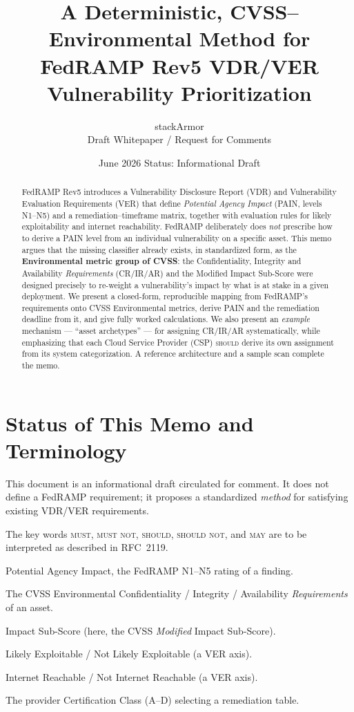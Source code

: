 \documentclass[11pt]{article}
\title{\bfseries A Deterministic, CVSS--Environmental Method for\\
FedRAMP Rev5 VDR/VER Vulnerability Prioritization}
\author{stackArmor \\ \small Draft Whitepaper / Request for Comments}
\date{June 2026 \quad\textbar\quad Status: Informational Draft}
\newcommand{\rfckw}[1]{\textsc{#1}}
\begin{document}
\maketitle

\begin{abstract}
\noindent
FedRAMP Rev5 introduces a Vulnerability Disclosure Report (VDR) and Vulnerability
Evaluation Requirements (VER) that define \emph{Potential Agency Impact} (PAIN,
levels N1--N5) and a remediation--timeframe matrix, together with evaluation rules
for likely exploitability and internet reachability. FedRAMP deliberately does
\emph{not} prescribe how to derive a PAIN level from an individual vulnerability on
a specific asset. This memo argues that the missing classifier already exists, in
standardized form, as the \textbf{Environmental metric group of CVSS}: the
Confidentiality, Integrity and Availability \emph{Requirements} (CR/IR/AR) and the
Modified Impact Sub-Score were designed precisely to re-weight a vulnerability's
impact by what is at stake in a given deployment. We present a closed-form,
reproducible mapping from FedRAMP's requirements onto CVSS Environmental metrics,
derive PAIN and the remediation deadline from it, and give fully worked
calculations. We also present an \emph{example} mechanism --- ``asset archetypes''
--- for assigning CR/IR/AR systematically, while emphasizing that each Cloud Service
Provider (CSP) \rfckw{should} derive its own assignment from its system
categorization. A reference architecture and a sample scan complete the memo.
\end{abstract}

\tableofcontents

\section{Status of This Memo and Terminology}
This document is an informational draft circulated for comment. It does not define
a FedRAMP requirement; it proposes a standardized \emph{method} for satisfying
existing VDR/VER requirements.

The key words \rfckw{must}, \rfckw{must not}, \rfckw{should}, \rfckw{should not},
and \rfckw{may} are to be interpreted as described in RFC~2119.

\begin{description}[leftmargin=1.5em,style=nextline]
\item[PAIN] Potential Agency Impact, the FedRAMP N1--N5 rating of a finding.
\item[CR/IR/AR] The CVSS Environmental Confidentiality / Integrity / Availability
  \emph{Requirements} of an asset.
\item[ISC] Impact Sub-Score (here, the CVSS \emph{Modified} Impact Sub-Score).
\item[LEV / NLEV] Likely Exploitable / Not Likely Exploitable (a VER axis).
\item[IRV / NIRV] Internet Reachable / Not Internet Reachable (a VER axis).
\item[Class] The provider Certification Class (A--D) selecting a remediation table.
\end{description}
\end{document}
